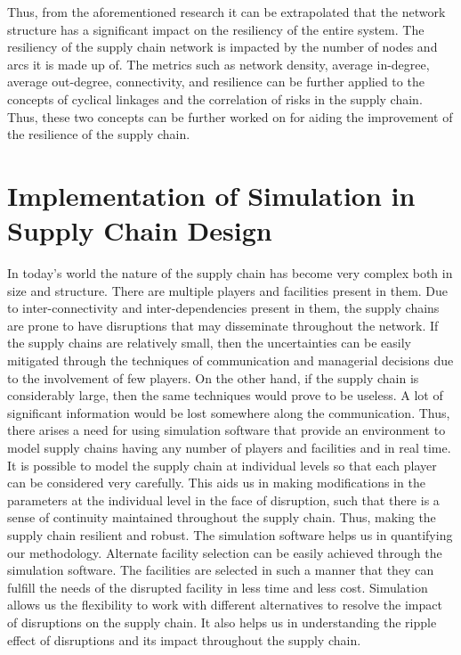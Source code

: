 Thus, from the aforementioned research it can be extrapolated that the network structure has a significant impact on the resiliency of the entire system. The resiliency of the supply chain network is impacted by the number of nodes and arcs it is made up of. The metrics such as network density, average in-degree, average out-degree, connectivity, and resilience can be further applied to the concepts of cyclical linkages and the correlation of risks in the supply chain. Thus, these two concepts can be further worked on for aiding the improvement of the resilience of the supply chain.


\section{Implementation of Simulation in Supply Chain Design} 
    
In today's world the nature of the supply chain has become very complex both in size and structure. There are multiple players and facilities present in them. Due to inter-connectivity and inter-dependencies present in them, the supply chains are prone to have disruptions that may disseminate throughout the network. If the supply chains are relatively small, then the uncertainties can be easily mitigated through the techniques of communication and managerial decisions due to the involvement of few players. On the other hand, if the supply chain is considerably large, then the same techniques would prove to be useless. A lot of significant information would be lost somewhere along the communication. Thus, there arises a need for using simulation software that provide an environment to model supply chains having any number of players and facilities and in real time. It is possible to model the supply chain at individual levels so that each player can be considered very carefully. This aids us in making modifications in the parameters at the individual level in the face of disruption, such that there is a sense of continuity maintained throughout the supply chain. Thus, making the supply chain resilient and robust. The simulation software helps us in quantifying our methodology. Alternate facility selection can be easily achieved through the simulation software. The facilities are selected in such a manner that they can fulfill the needs of the disrupted facility in less time and less cost. Simulation allows us the flexibility to work with different alternatives to resolve the impact of disruptions on the supply chain. It also helps us in understanding the ripple effect of disruptions and its impact throughout the supply chain.



